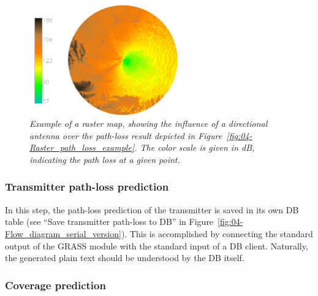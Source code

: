 \begin{figure}[h]
\centering

\includegraphics[width=0.6\textwidth]{04-framework_design_and_implementation/img/antenna_calculation}

\caption{\textit{\emph{Example of a raster map, showing the influence of a
directional antenna over the path-loss result depicted in Figure~\ref{fig:04-Raster_path_loss_example}.
The color scale is given in dB, indicating the path loss at a given
point. \label{fig:04-Raster_antenna_example}}}}
\end{figure}



\subsubsection{Transmitter path-loss prediction \label{sub:04-Transmitter_path_loss_prediction}}

In this step, the path-loss prediction of the transmitter is saved
in its own DB table (see ``Save transmitter path-loss to DB'' in
Figure~\ref{fig:04-Flow_diagram_serial_version}). This is accomplished
by connecting the standard output of the GRASS module with the standard
input of a DB client. Naturally, the generated plain text should be
understood by the DB itself.


\subsubsection{Coverage prediction \label{sub:04-Coverage_prediction}}

